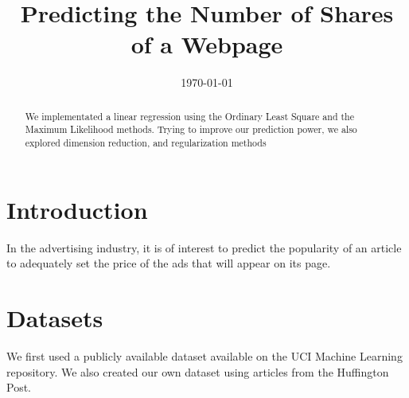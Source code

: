 \documentclass[conference]{IEEEtran}\usepackage[]{graphicx}\usepackage[]{color}
\date{\today}
\begin{document}
% 
\title{Predicting the Number of Shares of a Webpage}


\author{
  \and
  \and
  }



\maketitle



\begin{abstract}
  We implementated a linear regression using the Ordinary Least Square and the
  Maximum Likelihood methods. Trying to improve our prediction power, we also
  explored dimension reduction, and regularization methods
\end{abstract}





\IEEEpeerreviewmaketitle


\section{Introduction}

In the advertising industry, it is of interest to predict the popularity of an
article to adequately set the price of the ads that will appear on its page.


\section{Datasets}

We first used a publicly available dataset available on the UCI Machine Learning
repository. We also created our own dataset using articles from the Huffington Post.
\end{document}
